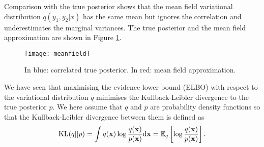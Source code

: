 \begin{exenumerate}
\begin{solution}
    Comparison with the true posterior shows that the mean field
    variational distribution $q(y_1, y_2 | x)$ has the same mean but
    ignores the correlation and underestimates the marginal
    variances. The true posterior and the mean field approximation are
    shown in Figure \ref{fig:meanfield}.

    \begin{figure}[h!]
      \centering
      \texttt{[image: meanfield]}
      \caption{\label{fig:meanfield}In blue: correlated true posterior. In red: mean field approximation.}
    \end{figure}
  \end{solution}


  
\end{exenumerate}

We have seen that maximising the evidence lower bound (ELBO) with
respect to the variational distribution $q$ minimises the
Kullback-Leibler divergence to the true posterior $p$. We here assume
that $q$ and $p$ are probability density functions so that the
Kullback-Leibler divergence between them is defined as
\begin{equation}
  \text{KL}(q || p) = \int q(\mathbf{x}) \log \frac{q(\mathbf{x})}{p(\mathbf{x})} \mathrm{d} \mathbf{x} = \mathbb{E}_q \left[\log \frac{q(\mathbf{x})}{p(\mathbf{x})}\right].
\end{equation}


